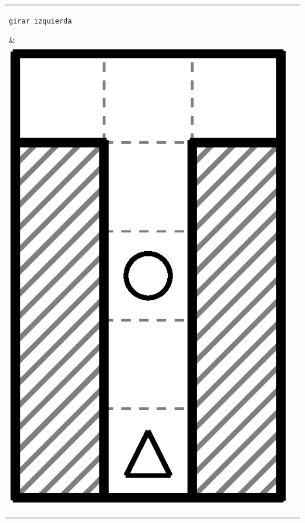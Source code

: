 \documentclass{oci}
\newcommand*{\tabbox}[2][t]{\vspace{0pt}\parbox[#1][2.3\baselineskip]{20em}{\strut#2\strut}}
\begin{document}
\begin{problemDescription}
\begin{center}
\begin{tabular}{|V|V|}
    \tabbox{\texttt{girar izquierda}}                 &\includegraphics[angle=90, scale=0.25]{laberintos/ejemplo1-2.eps}\\

\end{tabular}
\end{center}
\end{problemDescription}
\end{document}
